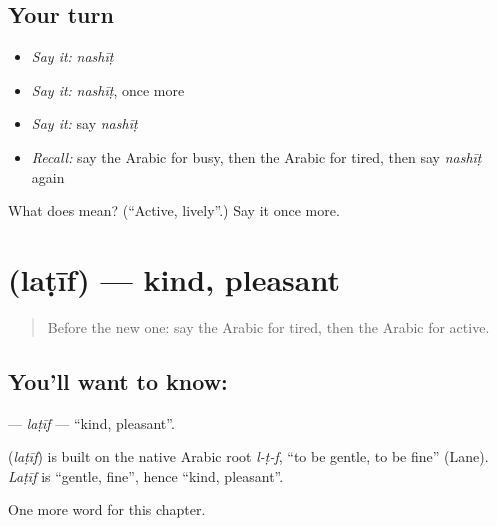 \subsection*{Your turn}
\begin{itemize}
\raggedright
  \item \emph{Say it:} \emph{nashīṭ}
  \item \emph{Say it:} \emph{nashīṭ}, once more
  \item \emph{Say it:} say \emph{nashīṭ}
  \item \emph{Recall:} say the Arabic for busy, then the Arabic for tired, then say \emph{nashīṭ} again
\end{itemize}

\begin{tcolorbox}[breakable,colback=teal!4,colframe=teal!35!black,title={Before you move on}]
What does  mean? (\textquotedblleft{}Active, lively\textquotedblright{}.) Say it once more.
\end{tcolorbox}
\section[\texorpdfstring{\ar{لطيف} (laṭīf)}{لطيف (laṭīf)}]{ (laṭīf) — kind, pleasant}

\label{lesson:AR-C147-latif}



\begin{quote}
Before the new one: say the Arabic for tired, then the Arabic for active.
\end{quote}

\subsection*{You'll want to know: }
\textbf{} — \emph{laṭīf} — \textquotedblleft{}kind, pleasant\textquotedblright{}.

\begin{cousinweb}
\textbf{} (\emph{laṭīf}) is built on the native Arabic root \emph{l-ṭ-f}, \textquotedblleft{}to be gentle, to be fine\textquotedblright{} (Lane). \emph{Laṭīf} is \textquotedblleft{}gentle, fine\textquotedblright{}, hence \textquotedblleft{}kind, pleasant\textquotedblright{}.
\end{cousinweb}

\begin{grammarlens}[title={What you've built}]
One more word for this chapter.
\end{grammarlens}

